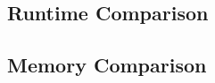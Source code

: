 \documentclass{book}
\begin{document}
\subsection{Runtime Comparison}






\cleardoublepage
\subsection{Memory Comparison}


\end{document}
